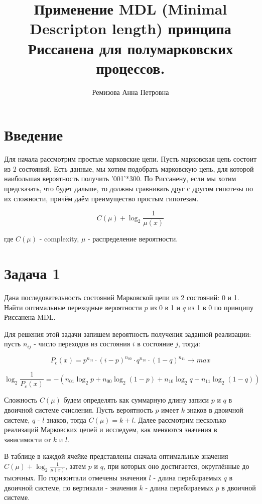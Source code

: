 \documentclass[12pt]{article}
\begin{document}
\title{Применение MDL (Minimal Descripton length) принципа Риссанена для полумарковских процессов.}
\author{Ремизова Анна Петровна}
\maketitle

\section*{Введение}
	Для начала рассмотрим простые марковские цепи. Пусть марковская цепь состоит из 2 состояний. Есть данные, мы хотим подобрать марковскую цепь, для которой наибольшая вероятность получить '001'*300. По Риссанену, если мы хотим предсказать, что будет дальше, то должны сравнивать друг с другом гипотезы по их сложности, причём даём преимущество простым гипотезам.
	
	$$C(\mu)+\log_2{\frac{1}{\mu(x)}}$$
	
	где $C(\mu)$ - complexity, $\mu$ - распределение вероятности.
	
\section*{Задача 1}
Дана последовательность состояний Марковской цепи из 2 состояний: 0 и 1. Найти оптимальные переходные вероятности $p$ из 0 в 1 и $q$ из 1 в 0 по принципу Риссанена MDL. 

Для решения этой задачи запишем вероятность получения заданной реализации: пусть $n_{ij}$ - число переходов из состояния $i$ в состояние $j$, тогда:

$$P_c(x) = p^{n_{01}}\cdot(i-p)^{n_{00}}\cdot q^{n_{10}}\cdot(1-q)^{n_{11}}\to max$$ 

$$\log_2{\frac{1}{P_c(x)}}=-(n_{01}\log_2{p}+n_{00}\log_2{(1-p)}+n_{10}\log_2{q}+n_{11}\log_2{(1-q)})$$

Сложность $C(\mu)$ будем определять как суммарную длину записи $p$ и $q$ в двоичной системе счисления. Пусть вероятность $p$ имеет $k$ знаков в двоичной системе, $q$ - $l$ знаков, тогда $C(\mu)=k+l$. Далее рассмотрим несколько реализаций Марковских цепей и исследуем, как меняются значения в зависимости от $k$ и $l$.

В таблице в каждой ячейке представлены сначала оптимальные значения $C(\mu)+\log_2{\frac{1}{\mu(x)}}$, затем $p$ и $q$, при которых оно достигается, округлённые до тысячных. По горизонтали отмечены значения $l$ - длина перебираемых $q$  в двоичной системе, по вертикали - значения $k$ - длина перебираемых $p$  в двоичной системе.
\end{document}
